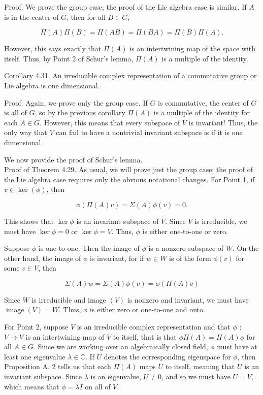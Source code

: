\documentclass[10pt, letterpaper]{article}
\begin{document}
Proof. We prove the group case; the proof of the Lie algebra case is similar. If $A$ is in the center of $G$, then for all $B \in G$,

$$
\Pi(A) \Pi(B)=\Pi(A B)=\Pi(B A)=\Pi(B) \Pi(A) .
$$

However, this says exactly that $\Pi(A)$ is an intertwining map of the space with itself. Thus, by Point 2 of Schur's lemma, $\Pi(A)$ is a multiple of the identity.

Corollary 4.31. An irreducible complex representation of a commutative group or Lie algebra is one dimensional.

Proof. Again, we prove only the group case. If $G$ is commutative, the center of $G$ is all of $G$, so by the previous corollary $\Pi(A)$ is a multiple of the identity for each $A \in G$. However, this means that every subspace of $V$ is invariant! Thus, the only way that $V$ can fail to have a nontrivial invariant subspace is if it is one dimensional.

We now provide the proof of Schur's lemma.\\
Proof of Theorem 4.29. As usual, we will prove just the group case; the proof of the Lie algebra case requires only the obvious notational changes. For Point 1, if $v \in \operatorname{ker}(\phi)$, then

$$
\phi(\Pi(A) v)=\Sigma(A) \phi(v)=0 .
$$

This shows that $\operatorname{ker} \phi$ is an invariant subspace of $V$. Since $V$ is irreducible, we must have $\operatorname{ker} \phi=0$ or $\operatorname{ker} \phi=V$. Thus, $\phi$ is either one-to-one or zero.

Suppose $\phi$ is one-to-one. Then the image of $\phi$ is a nonzero subspace of $W$. On the other hand, the image of $\phi$ is invariant, for if $w \in W$ is of the form $\phi(v)$ for some $v \in V$, then

$$
\Sigma(A) w=\Sigma(A) \phi(v)=\phi(\Pi(A) v)
$$

Since $W$ is irreducible and image $(V)$ is nonzero and invariant, we must have $\operatorname{image}(V)=W$. Thus, $\phi$ is either zero or one-to-one and onto.

For Point 2, suppose $V$ is an irreducible complex representation and that $\phi$ : $V \rightarrow V$ is an intertwining map of $V$ to itself, that is that $\phi \Pi(A)=\Pi(A) \phi$ for all $A \in G$. Since we are working over an algebraically closed field, $\phi$ must have at least one eigenvalue $\lambda \in \mathbb{C}$. If $U$ denotes the corresponding eigenspace for $\phi$, then Proposition A. 2 tells us that each $\Pi(A)$ maps $U$ to itself, meaning that $U$ is an invariant subspace. Since $\lambda$ is an eigenvalue, $U \neq 0$, and so we must have $U=V$, which means that $\phi=\lambda I$ on all of $V$.
\end{document}

